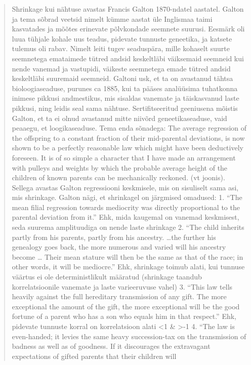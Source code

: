 \documentclass[]{book}
\begin{document}
\begin{quote}
Shrinkage kui nähtuse avastas Francis Galton 1870-ndatel aastatel.
Galton ja tema sõbrad veetsid nimelt kümme aastat üle Inglismaa taimi
kasvatades ja mõõtes erinevate põlvkondade seemnete suurusi. Eesmärk oli
luua tühjale kohale uus teadus, pidevate tunnuste geneetika, ja katsete
tulemus oli rabav. Nimelt leiti tugev seaduspära, mille kohaselt suurte
seemnetega emataimede tütred andsid keskeltläbi väiksemaid seemneid kui
nende vanemad ja vastupidi, väikeste seemnetega emade tütred andsid
keskeltläbi suuremaid seemneid. Galtoni usk, et ta on avastanud tähtsa
bioloogiaseaduse, purunes ca 1885, kui ta pääses analüüsima tuhatkonna
inimese pikkusi andmestikus, mis sisaldas vanemate ja täiskasvanud laste
pikkusi, ning leidis seal sama nähtuse. Sertifitseeritud geeniusena
mõistis Galton, et ta ei olnud avastanud mitte niivõrd geneetikaseaduse,
vaid peaaegu, et loogikaseaduse. Tema enda sõnadega: The average
regression of the offspring to a constant fraction of their mid-parental
deviations, is now shown to be a perfectly reasonable law which might
have been deductively foreseen. It is of so simple a character that I
have made an arrangement with pulleys and weights by which the probable
average height of the children of known parents can be mechanically
reckoned. (vt joonis). Sellega avastas Galton regressiooni keskmisele,
mis on sisuliselt sama asi, mis shrinkage. Galton nägi, et shrinkagel on
järgmised omadused: 1. ``The mean filial regression towards mediocrity
was directly proportional to the parental deviation from it.'' Ehk, mida
kaugemal on vanemad keskmisest, seda suurema amplituudiga on nende laste
shrinkage 2. ``The child inherits partly from his parents, partly from
his ancestry. \ldots{}the further his genealogy goes back, the more
numerous and varied will his ancestry become \ldots{} Their mean stature
will then be the same as that of the race; in other words, it will be
mediocre.'' Ehk, shrinkage toimub alati, kui tunnuse väärtus ei ole
deterministlikult määratud (shrinkage taandub korrelatsioonile vanemate
ja laste varieeruvuse vahel) 3. ``This law tells heavily against the
full hereditary transmission of any gift. The more exceptional the
amount of the gift, the more exceptional will be the good fortune of a
parent who has a son who equals him in that respect.'' Ehk, pidevate
tunnuste korral on korrelatsioon alati \textless{}1 \& \textgreater{}-1
4. ``The law is even-handed; it levies the same heavy succession-tax on
the transmission of badness as well as of goodness. If it discourages
the extravagant expectations of gifted parents that their children will

\end{quote}
\end{document}
